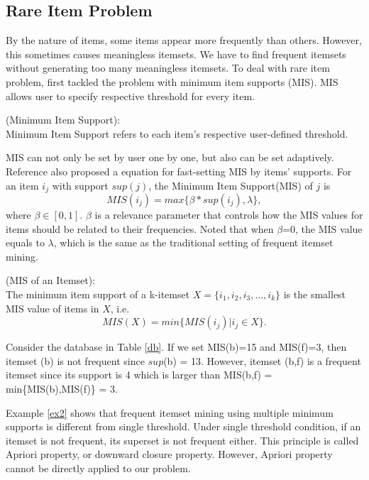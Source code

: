 \documentclass[conference]{IEEEtran}
\begin{document}
\subsection{Rare Item Problem}
By the nature of items, some items appear more frequently than others. However, this sometimes causes meaningless itemsets.
We have to find frequent itemsets without generating too many meaningless itemsets.
To deal with rare item problem, \cite{b2} first tackled the problem with minimum item supports (MIS).
MIS allows user to specify respective threshold for every item. 
\begin{definition}{(Minimum Item Support):}\\
Minimum Item Support refers to each item's respective user-defined threshold.
\end{definition}
MIS can not only be set by user one by one, but also can be set adaptively.
Reference \cite{b2} also proposed a equation for fast-setting MIS by items' supports.
For an item $i_j$ with support $sup(j)$, the Minimum Item Support(MIS) of $j$ is
\begin{equation} 
MIS(i_j)=max\{\beta*sup(i_j),\lambda\},\label{eq}
\end{equation}
where $\beta\in[0,1]$.
$\beta$ is a relevance parameter that controls how the MIS values for items should be related to their frequencies.
Noted that when $\beta$=0, the MIS value equals to $\lambda$, 
which is the same as the traditional setting of frequent itemset mining.


\begin{definition}{(MIS of an Itemset):}\\
The minimum item support of a k-itemset $X=\{i_1,i_2,i_3,\dots,i_k\}$ is the smallest MIS value of items in $X$, i.e. \\
\begin{equation} 
MIS(X)=min\{MIS(i_j)|i_j\in X\}.\label{eq2}
\end{equation}
\end{definition}

\begin{example}\label{ex2}
Consider the database in Table \ref{db}. 
If we set MIS(b)=15 and MIS(f)=3, then itemset (b) is not frequent since $sup$(b) = 13. 
However, itemset (b,f) is a frequent itemset since its support is 4 which is larger than MIS(b,f) = min\{MIS(b),MIS(f)\} = 3.
\end{example}
Example \ref{ex2} shows that frequent itemset mining using multiple minimum supports is different from single threshold.
Under single threshold condition, if an itemset is not frequent, its superset is not frequent either.
This principle is called Apriori property, or downward closure property. 
However, Apriori property cannot be directly applied to our problem.
\end{document}
